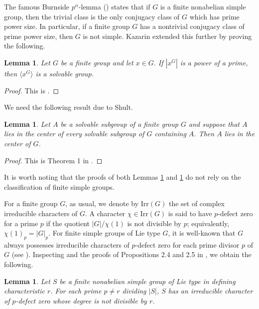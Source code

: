 \documentclass[twoside,a4paper,reqno,12pt]{amsart}
\newcommand{\<}{\langle}
\renewcommand{\>}{\rangle}
\newcommand{\la}{\langle}
\newcommand{\ra}{\rangle}
\newcommand{\Irr}{\mathrm {Irr}}
\renewcommand{\:}{\colon}
\newtheorem{lem}[thm]{Lemma}
\theoremstyle{definition}
\begin{document}
The famous Burnside $p^\alpha$-lemma (\cite[Theorem 3.9]{Isaacs-ct}) states that if $G$ is a finite nonabelian simple group, then the trivial class is the only conjugacy class of $G$ which has prime power size. In particular, if a finite group $G$ has a nontrivial conjugacy class of prime power size, then $G$ is not simple. Kazarin   extended this further by proving the following.


\begin{lem}\label{lem:pa}
Let $G$ be a finite group and let $x\in G.$ If $|x^G|$ is a power of a prime, then $\la x^G\ra$ is a solvable group.
\end{lem}

\begin{proof}
This is \cite[Theorem]{Kazarin}.
\end{proof}

We need the following result due to Shult. 
\begin{lem}\label{lem:central}
Let $A$ be a solvable subgroup of a finite group $G$ and suppose that $A$ lies in the center of every solvable subgroup of $G$ containing $A$. Then $A$ lies in the center of $G$.
\end{lem}

\begin{proof}
This is Theorem 1 in \cite{Shult}.
\end{proof}

It is worth noting that the proofs of both Lemmas \ref{lem:pa} and \ref{lem:central} do not rely on the classification of finite simple groups.

For a finite group $G$, as usual, we denote by $\Irr(G)$ the set of complex irreducible characters of $G$. A character $\chi\in\Irr(G)$ is said to have $p$-defect zero for a prime $p$ if the quotient $|G|/\chi(1)$ is not divisible by $p$; equivalently, $\chi(1)_p=|G|_p$. 
For finite simple groups of Lie type $G$, it is well-known that $G$ always possesses irreducible characters of $p$-defect zero for each prime divisor $p$ of $G$ (see \cite{Michler,Willems}).  Inspecting  \cite{Michler,Willems} and the proofs of Propositions 2.4 and 2.5 in \cite{Malle}, we obtain the following.

\begin{lem}\label{lem:semisimple}
Let $S$ be a finite nonabelian simple group of Lie type in defining characteristic $r$. For each prime $p\neq r$ dividing $|S|$, $S$ has an irreducible character of $p$-defect zero whose degree is not divisible by $r$.
\end{lem}
\end{document}

